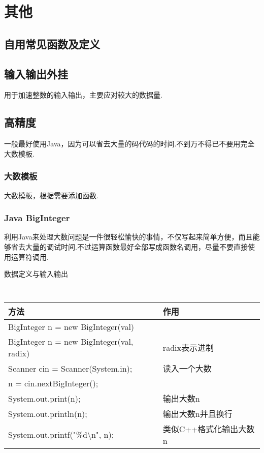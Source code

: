 \clearpage\chapter{其他}
\section{自用常见函数及定义}\small




\section{输入输出外挂}\small
用于加速整数的输入输出，主要应对较大的数据量.



\section{高精度}\small
一般最好使用Java，因为可以省去大量的码代码的时间.不到万不得已不要用完全
大数模板.


    \subsection{大数模板}\small
大数模板，根据需要添加函数.



    \subsection{Java BigInteger}\small
利用Java来处理大数问题是一件很轻松愉快的事情，不仅写起来简单方便，而且能
够省去大量的调试时间.不过运算函数最好全部写成函数名调用，尽量不要直接使
用运算符调用.

数据定义与输入输出
{\tt
    \begin{longtable}{|p{9.3cm}|p{6cm}|}
    \hline
    方法 & 作用 \\
    \hline
    BigInteger n = new BigInteger(val) & \\
    \hline
    BigInteger n = new BigInteger(val, radix) & radix表示进制 \\
    \hline
    Scanner cin = Scanner(System.in); & 读入一个大数 \\
    n = cin.nextBigInteger(); & \\
    \hline
    System.out.print(n); & 输出大数n \\
    \hline
    System.out.println(n); & 输出大数n并且换行 \\
    \hline
    System.out.printf("\%d\textbackslash n", n); & 类似C++格式化输出大数n \\
    \hline
    \end{longtable}
}

